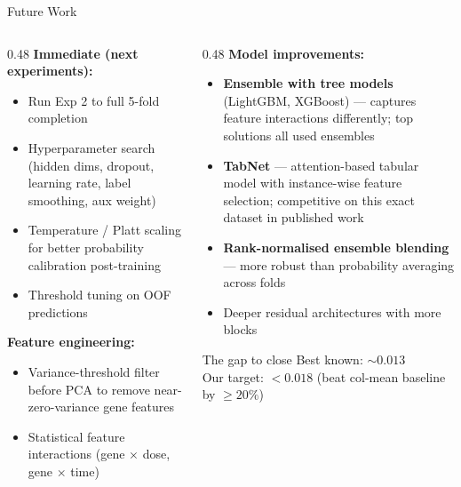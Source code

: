\documentclass[aspectratio=169, 10pt]{beamer}
\begin{document}
\begin{frame}{Future Work}
  \begin{columns}[T]
    \begin{column}{0.48\textwidth}
      \textbf{Immediate (next experiments):}
      \begin{itemize}
        \item Run Exp 2 to full 5-fold completion
        \item Hyperparameter search (hidden dims, dropout,
              learning rate, label smoothing, aux weight)
        \item Temperature / Platt scaling for better
              probability calibration post-training
        \item Threshold tuning on OOF predictions
      \end{itemize}
      \vspace{0.5em}
      \textbf{Feature engineering:}
      \begin{itemize}
        \item Variance-threshold filter before PCA
              to remove near-zero-variance gene features
        \item Statistical feature interactions
              (gene $\times$ dose, gene $\times$ time)
      \end{itemize}
    \end{column}
    \begin{column}{0.48\textwidth}
      \textbf{Model improvements:}
      \begin{itemize}
        \item \textbf{Ensemble with tree models} (LightGBM, XGBoost)
              — captures feature interactions differently;
              top solutions all used ensembles
        \item \textbf{TabNet} — attention-based tabular model with
              instance-wise feature selection; competitive
              on this exact dataset in published work
        \item \textbf{Rank-normalised ensemble blending} — more
              robust than probability averaging across folds
        \item Deeper residual architectures with more blocks
      \end{itemize}
      \vspace{0.3em}
      \begin{exampleblock}{The gap to close}
        Best known: $\sim 0.013$\\
        Our target: $< 0.018$ (beat col-mean baseline
        by $\geq 20\%$)
      \end{exampleblock}
    \end{column}
  \end{columns}
\end{frame}
\end{document}
